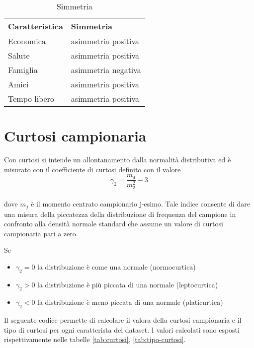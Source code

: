 \documentclass[]{book}
\providecommand{\tightlist}{%
  \setlength{\itemsep}{0pt}\setlength{\parskip}{0pt}}
\begin{document}
\begin{table}

\caption{\label{tab:tipoSimmetria}Simmetria}
\centering
\begin{tabular}[t]{l|l}
\hline
Caratteristica & Simmetria\\
\hline
Economica & asimmetria positiva\\
\hline
Salute & asimmetria positiva\\
\hline
Famiglia & asimmetria negativa\\
\hline
Amici & asimmetria positiva\\
\hline
Tempo libero & asimmetria positiva\\
\hline
\end{tabular}
\end{table}

\section{Curtosi campionaria}\label{curtosi-campionaria}

Con curtosi si intende un allontanamento dalla normalità distributiva ed
è misurato con il coefficiente di curtosi definito con il valore
\[\gamma_2=\frac{m_4}{m_2^2} - 3\]\\
dove \(m_j\) è il momento centrato campionario j-esimo. Tale indice
consente di dare una misura della piccatezza della distribuzione di
frequenza del campione in confronto alla densità normale standard che
assume un valore di curtosi campionaria pari a zero.

Se

\begin{itemize}
\tightlist
\item
  \(\gamma_2 = 0\) la distribuzione è come una normale (normocurtica)
\item
  \(\gamma_2 > 0\) la distribuzione è più piccata di una normale
  (leptocurtica)
\item
  \(\gamma_2 < 0\) la distribuzione è meno piccata di una normale
  (platicurtica)
\end{itemize}

Il seguente codice permette di calcolare il valora della curtosi
campionaria e il tipo di curtosi per ogni caratterista del dataset. I
valori calcolati sono esposti rispettivamente nelle tabelle
\ref{tab:curtosi}, \ref{tab:tipo-curtosi}.
\end{document}
